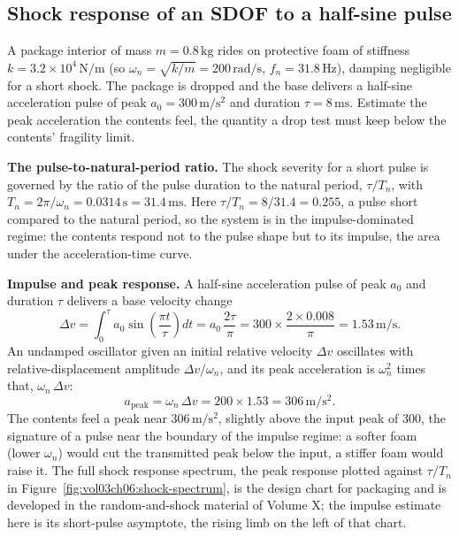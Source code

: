 \subsection{Shock response of an SDOF to a half-sine pulse}

A package interior of mass $m = 0.8\,\si{\kilogram}$ rides on protective
foam of stiffness $k = 3.2\times 10^4\,\si{\newton\per\meter}$ (so
$\omega_n = \sqrt{k/m} = 200\,\si{\radian\per\second}$, $f_n =
31.8\,\si{\hertz}$), damping negligible for a short shock. The package is
dropped and the base delivers a half-sine acceleration pulse of peak
$a_0 = 300\,\si{\meter\per\second\squared}$ and duration $\tau = 8\,\si{
\milli\second}$. Estimate the peak acceleration the contents feel, the
quantity a drop test must keep below the contents' fragility limit.

\textbf{The pulse-to-natural-period ratio.} The shock severity for a
short pulse is governed by the ratio of the pulse duration to the
natural period, $\tau/T_n$, with $T_n = 2\pi/\omega_n = 0.0314\,\si{
\second} = 31.4\,\si{\milli\second}$. Here $\tau/T_n = 8/31.4 = 0.255$,
a pulse short compared to the natural period, so the system is in the
impulse-dominated regime: the contents respond not to the pulse shape
but to its impulse, the area under the acceleration-time curve.

\textbf{Impulse and peak response.} A half-sine acceleration pulse of
peak $a_0$ and duration $\tau$ delivers a base velocity change
\[
\Delta v = \int_0^\tau a_0\sin\!\left(\frac{\pi t}{\tau}\right)dt =
a_0\,\frac{2\tau}{\pi} = 300\times\frac{2\times 0.008}{\pi} = 1.53\,\si{
\meter\per\second}.
\]
An undamped oscillator given an initial relative velocity $\Delta v$
oscillates with relative-displacement amplitude $\Delta v/\omega_n$, and
its peak acceleration is $\omega_n^2$ times that, $\omega_n\,\Delta v$:
\[
a_{\text{peak}} = \omega_n\,\Delta v = 200\times 1.53 = 306\,\si{\meter
\per\second\squared}.
\]
The contents feel a peak near $306\,\si{\meter\per\second\squared}$,
slightly above the input peak of $300$, the signature of a pulse near
the boundary of the impulse regime: a softer foam (lower $\omega_n$)
would cut the transmitted peak below the input, a stiffer foam would
raise it. The full shock response spectrum, the peak response plotted
against $\tau/T_n$ in Figure~\ref{fig:vol03ch06:shock-spectrum}, is the
design chart for packaging and is developed in the random-and-shock
material of Volume X; the impulse estimate here is its short-pulse
asymptote, the rising limb on the left of that chart.

